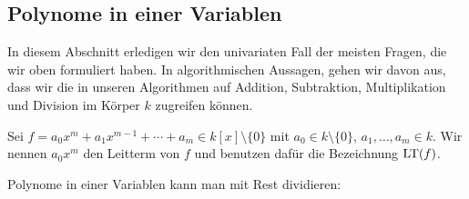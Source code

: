 \documentclass[11pt]{article}
\numberwithin{equation}{section}
\begin{document}
\subsection{Polynome in einer Variablen} 

In diesem Abschnitt erledigen wir den univariaten Fall der meisten Fragen, die wir oben formuliert haben. In algorithmischen Aussagen, gehen wir davon aus, dass wir die in unseren Algorithmen auf Addition, Subtraktion, Multiplikation und Division im Körper $k$ zugreifen können. 

\begin{definition}
	Sei $f = a_0 x^m + a_1 x^{m-1} + \cdots + a_m \in k[x] \setminus \{0\}$ mit $a_0 \in k\setminus \{0\}$, $a_1,\ldots,a_m \in k$. Wir nennen $a_0 x^m$ den Leitterm von $f$ und benutzen dafür die Bezeichnung $\operatorname{LT}(f)$. 
\end{definition} 

Polynome in einer Variablen kann man mit Rest dividieren: 
\end{document}
